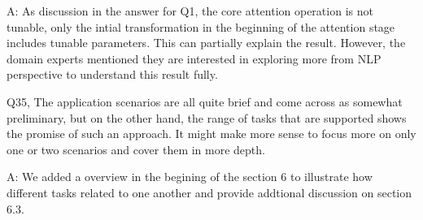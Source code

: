 A: As discussion in the answer for Q1, the core attention operation is not tunable, only the intial transformation in the beginning of the attention stage includes tunable parameters. This can partially explain the result. However, the domain experts mentioned they are interested in exploring more from NLP perspective to understand this result fully.

Q35, The application scenarios are all quite brief and come across as somewhat preliminary, but on the other hand, the range of tasks that are supported shows the promise of such an approach. It might make more sense to focus more on only one or two scenarios and cover them in more depth.

A: We added a overview in the begining of the section 6 to illustrate how different tasks related to one another and provide addtional discussion on section 6.3.

